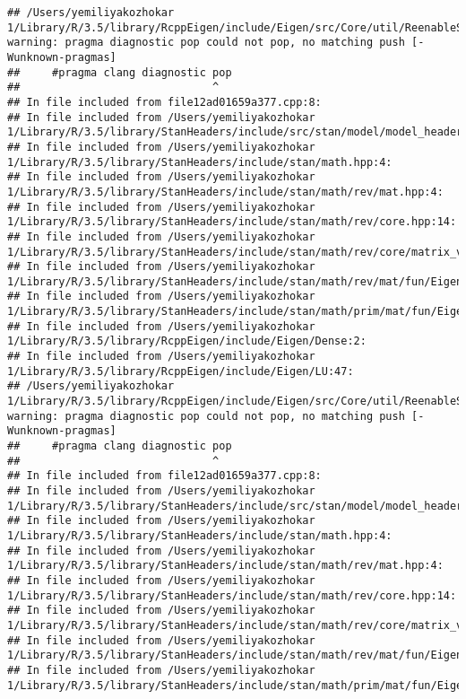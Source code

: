 \documentclass[]{article}
\begin{document}
\begin{verbatim}
## /Users/yemiliyakozhokar 1/Library/R/3.5/library/RcppEigen/include/Eigen/src/Core/util/ReenableStupidWarnings.h:10:30: warning: pragma diagnostic pop could not pop, no matching push [-Wunknown-pragmas]
##     #pragma clang diagnostic pop
##                              ^
## In file included from file12ad01659a377.cpp:8:
## In file included from /Users/yemiliyakozhokar 1/Library/R/3.5/library/StanHeaders/include/src/stan/model/model_header.hpp:4:
## In file included from /Users/yemiliyakozhokar 1/Library/R/3.5/library/StanHeaders/include/stan/math.hpp:4:
## In file included from /Users/yemiliyakozhokar 1/Library/R/3.5/library/StanHeaders/include/stan/math/rev/mat.hpp:4:
## In file included from /Users/yemiliyakozhokar 1/Library/R/3.5/library/StanHeaders/include/stan/math/rev/core.hpp:14:
## In file included from /Users/yemiliyakozhokar 1/Library/R/3.5/library/StanHeaders/include/stan/math/rev/core/matrix_vari.hpp:4:
## In file included from /Users/yemiliyakozhokar 1/Library/R/3.5/library/StanHeaders/include/stan/math/rev/mat/fun/Eigen_NumTraits.hpp:4:
## In file included from /Users/yemiliyakozhokar 1/Library/R/3.5/library/StanHeaders/include/stan/math/prim/mat/fun/Eigen.hpp:4:
## In file included from /Users/yemiliyakozhokar 1/Library/R/3.5/library/RcppEigen/include/Eigen/Dense:2:
## In file included from /Users/yemiliyakozhokar 1/Library/R/3.5/library/RcppEigen/include/Eigen/LU:47:
## /Users/yemiliyakozhokar 1/Library/R/3.5/library/RcppEigen/include/Eigen/src/Core/util/ReenableStupidWarnings.h:10:30: warning: pragma diagnostic pop could not pop, no matching push [-Wunknown-pragmas]
##     #pragma clang diagnostic pop
##                              ^
## In file included from file12ad01659a377.cpp:8:
## In file included from /Users/yemiliyakozhokar 1/Library/R/3.5/library/StanHeaders/include/src/stan/model/model_header.hpp:4:
## In file included from /Users/yemiliyakozhokar 1/Library/R/3.5/library/StanHeaders/include/stan/math.hpp:4:
## In file included from /Users/yemiliyakozhokar 1/Library/R/3.5/library/StanHeaders/include/stan/math/rev/mat.hpp:4:
## In file included from /Users/yemiliyakozhokar 1/Library/R/3.5/library/StanHeaders/include/stan/math/rev/core.hpp:14:
## In file included from /Users/yemiliyakozhokar 1/Library/R/3.5/library/StanHeaders/include/stan/math/rev/core/matrix_vari.hpp:4:
## In file included from /Users/yemiliyakozhokar 1/Library/R/3.5/library/StanHeaders/include/stan/math/rev/mat/fun/Eigen_NumTraits.hpp:4:
## In file included from /Users/yemiliyakozhokar 1/Library/R/3.5/library/StanHeaders/include/stan/math/prim/mat/fun/Eigen.hpp:4:

\end{verbatim}
\end{document}
